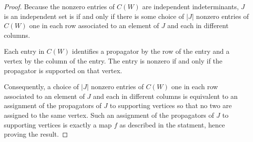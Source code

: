 \documentclass[11pt]{article}
\theoremstyle{remark}
\theoremstyle{definition}
\begin{document}
\begin{proof}
Because the nonzero entries of $C(W)$ are independent indeterminants, $J$ is an independent set is if and only if there is some choice of $|J|$ nonzero entries of $C(W)$ one in each row associated to an element of $J$ and each in different columns.

Each entry in $C(W)$ identifies a propagator by the row of the entry and a vertex by the column of the entry.  The entry is nonzero if and only if the propagator is supported on that vertex.

Consequently, a choice of $|J|$ nonzero entries of $C(W)$ one in each row associated to an element of $J$ and each in different columns is equivalent to an assignment of the propagators of $J$ to supporting vertices so that no two are assigned to the same vertex.  Such an assignment of the propagators of $J$ to supporting vertices is exactly a map $f$ as described in the statment, hence proving the result.
\end{proof}
\end{document}
